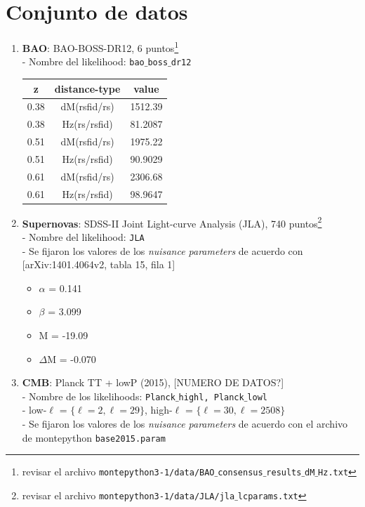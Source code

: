 \documentclass[a4paper,10pt]{article}
\begin{document}
\section{Conjunto de datos}
\begin{enumerate}
 \item \textbf{BAO}: BAO-BOSS-DR12, 6 puntos\footnote{revisar el archivo \texttt{montepython3-1/data/BAO$\_$consensus$\_$results$\_$dM$\_$Hz.txt}}\\
   - Nombre del likelihood: \texttt{bao$\_$boss$\_$dr12}
 
 \vspace{.2cm}
 \begin{tabular}{c|c|c}
 \hline
  z & distance-type & value \\ \hline
  0.38 & dM(rsfid/rs) & 1512.39 \\
  0.38 & Hz(rs/rsfid) & 81.2087 \\
  0.51 & dM(rsfid/rs) & 1975.22 \\
  0.51 & Hz(rs/rsfid) & 90.9029 \\
  0.61 & dM(rsfid/rs) & 2306.68 \\
  0.61 & Hz(rs/rsfid) & 98.9647 \\
 \hline
 \end{tabular}
 
 \item \textbf{Supernovas}: SDSS-II Joint Light-curve Analysis (JLA), 740 puntos\footnote{revisar el archivo \texttt{montepython3-1/data/JLA/jla$\_$lcparams.txt}}\\
   - Nombre del likelihood: \texttt{JLA}\\
   - Se fijaron los valores de los \textit{nuisance parameters} de acuerdo con [arXiv:1401.4064v2, tabla 15, fila 1] 
   
   \begin{itemize}
    \item $\alpha$ = 0.141
    \item $\beta$ = 3.099
    \item M = -19.09
    \item $\Delta$M = -0.070
   \end{itemize}

 \item \textbf{CMB}: Planck TT + lowP (2015), [NUMERO DE DATOS?] \\
   - Nombre de los likelihoods: \texttt{Planck$\_$highl, Planck$\_$lowl} \\
   - low-$\ell$ = $\{\ell=2, \ell=29\}$, high-$\ell$ = $\{\ell=30, \ell=2508\}$ \\
   - Se fijaron los valores de los \textit{nuisance parameters} de acuerdo con el archivo de montepython \texttt{base2015.param}
   

\end{enumerate}
\end{document}
